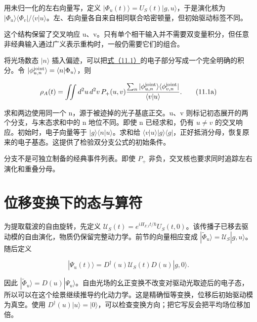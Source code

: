 \documentclass[UTF8,a4paper,zihao=-4,openany,fontset=fandol]{ctexbook}
\begin{document}
用未归一化的左右向量写，定义 $|\Phi_u(t)\rangle=U_S(t)|g,u\rangle$，于是演化核为 $|\Phi_u\rangle\langle\Phi_v|/\langle v|u\rangle$。左、右向量各自来自相同联合哈密顿量，但初始驱动标签不同。



这个结构保留了交叉响应 u、v。只有单个相干输入并不需要双变量积分，但任意非经典输入通过广义表示重构时，一般仍需要它们的组合。



将光场数态 $|n\rangle$ 插入偏迹，可以把\hyperref[eq:11.1]{式（11.1）}的电子部分写成一个完全明确的积分。令 $|\phi_{u,n}^{\rm joint}\rangle=\langle n|\Phi_u\rangle$，则



\begin{equation*}
\rho_A(t)=\iint d^2u\,d^2v\,P_+(u,v)
\frac{\sum_n|\phi_{u,n}^{\rm joint}\rangle
\langle\phi_{v,n}^{\rm joint}|}{\langle v|u\rangle}.
\tag{11.1a}\label{eq:11.1a}
\end{equation*}


求和两边使用同一个 n，源于被迹掉的光子基底正交。u、v 则标记初态展开的两个分支，与末态求和中的 n 地位不同。即使 n 已经求和，仍有 $u\ne v$ 的交叉响应。初始时，电子向量等于 $|g\rangle\langle n|u\rangle$。求和给 $\langle v|u\rangle|g\rangle\langle g|$，正好抵消分母，恢复原来的电子基态。这提供了检验双分支公式的初始条件。



分支不是可独立制备的经典事件列表。即使 $P_+$ 非负，交叉核也要求同时追踪左右演化和重叠分母。



\section{位移变换下的态与算符}\label{sec:11:4}


为提取载波的自由旋转，先定义 $\mathcal U_S(t)=e^{iH_{F,l}t/\hbar}U_S(t,0)$。该传播子已移去驱动模的自由演化，物质仍保留完整动力学。前节的向量相应变成 $|\widetilde\Phi_u\rangle=\mathcal U_S|g,u\rangle$。随后定义



\begin{equation*}
|\Psi_u(t)\rangle=D^\dagger(u)\mathcal U_S(t)D(u)|g,0\rangle.
\tag{11.2}\label{eq:11.2}
\end{equation*}


因此 $|\widetilde\Phi_u\rangle=D(u)|\Psi_u\rangle$。自由光场的幺正变换不改变对驱动光取迹后的电子态，所以可以在这个绘景继续推导约化动力学。这是精确恒等变换，位移后初始驱动模为真空。使用 $D^\dagger(u)|u\rangle=|0\rangle$，可以检查变换方向；把它写反会把平均场位移加倍。
\end{document}
